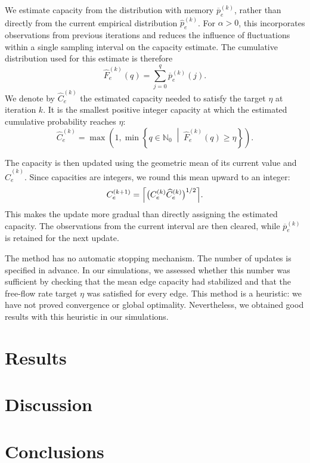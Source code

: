 \documentclass[a4paper]{article}
\begin{document}
We estimate capacity from the distribution with memory
$\overline{p}_e^{(k)}$, rather than directly from the current empirical
distribution $\widehat{p}_e^{(k)}$. For $\alpha>0$, this incorporates
observations from previous iterations and reduces the influence of
fluctuations within a single sampling interval on the capacity estimate.
The cumulative distribution used for this estimate is therefore
\begin{equation}
    \widehat{F}_e^{(k)}(q) = \sum_{j=0}^{q} \overline{p}_e^{(k)}(j).
\end{equation}
We denote by $\widehat{C}_e^{(k)}$ the estimated capacity needed to satisfy
the target $\eta$ at iteration $k$. It is the smallest positive integer
capacity at which the estimated cumulative probability reaches $\eta$:
\begin{equation}
    \label{eq:minimum_capacity}
    \widehat{C}_e^{(k)} = \max\left(1,
        \min\left\{q \in \mathbb{N}_0 \;\middle|\;
        \widehat{F}_e^{(k)}(q) \geq \eta\right\}\right).
\end{equation}

The capacity is then updated using the geometric mean of its current
value and $\widehat{C}_e^{(k)}$. Since capacities are integers, we round this
mean upward to an integer:
\begin{equation}
    \label{eq:capacity_update}
    C_e^{(k+1)}
    = \Bigl\lceil \bigl(C_e^{(k)} \widehat{C}_e^{(k)}\bigr)^{1/2} \Bigr\rceil.
\end{equation}
This makes the update more gradual than directly assigning the
estimated capacity. The observations from the current interval are
then cleared, while $\overline{p}_e^{(k)}$ is retained for the next update.

The method has no automatic stopping mechanism. The number of updates
is specified in advance. In our simulations, we assessed whether this
number was sufficient by checking
that the mean edge capacity had stabilized and that the free-flow rate
target $\eta$ was satisfied for every edge. This method is a heuristic:
we have not proved convergence or global optimality. Nevertheless, we
obtained good results with this heuristic in our simulations.

\section{Results}

\section{Discussion}

\section{Conclusions}



\end{document}
